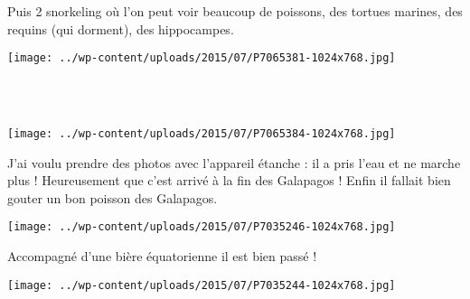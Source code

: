 Puis 2 snorkeling où l'on peut voir beaucoup de poissons, des tortues marines, des requins (qui dorment), des hippocampes. 
\begin{center} \texttt{[image: ../wp-content/uploads/2015/07/P7065381-1024x768.jpg]} \end{center}
~\\

~
\vspace{2mm}
\begin{center} \texttt{[image: ../wp-content/uploads/2015/07/P7065384-1024x768.jpg]} \end{center}
\vspace{-\topsep}
\pagebreak

J'ai voulu prendre des photos avec l'appareil étanche : il a pris l'eau et ne marche plus ! Heureusement que c'est arrivé à la fin des Galapagos !
\vfill
Enfin il fallait bien gouter un bon poisson des Galapagos. 
\vfill
\begin{center} \texttt{[image: ../wp-content/uploads/2015/07/P7035246-1024x768.jpg]} \end{center}
\vfill
Accompagné d'une bière équatorienne il est bien passé ! 
\vfill
\begin{center} \texttt{[image: ../wp-content/uploads/2015/07/P7035244-1024x768.jpg]} \end{center}
\vspace{-\topsep}
\vspace{-0.75mm}
